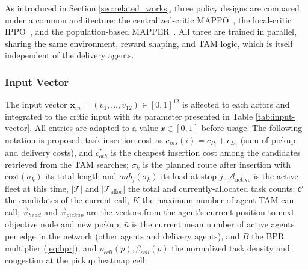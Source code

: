 \documentclass[sigconf]{acmart}
\begin{document}
As introduced in Section \ref{sec:related_works}, three policy designs are compared under a common architecture: the centralized-critic MAPPO~\cite{yu2022}, the local-critic IPPO~\cite{dewitt2020}, and the population-based MAPPER~\cite{liu2020}. All three are trained in parallel, sharing the same environment, reward shaping, and TAM logic, which is itself independent of the delivery agents.

\subsubsection{Input Vector}

The input vector $\mathbf{x}_{\mathit{in}} = (v_1, \dots, v_{12}) \in [0,1]^{12}$ is affected to each actors and integrated to the critic input with its parameter presented in Table \ref{tab:input-vector}. All entries are adapted to a value $\mathcal{x}\in[0,1]$ before usage. The following notation is proposed: task insertion cost as $c_{\mathit{ins}}(i) = c_{P_i} + c_{D_i}$ (sum of pickup and delivery costs), and $c^*_{\mathit{oth}}$ is the cheapest insertion cost among the candidates retrieved from the TAM searches; $\sigma_k$ is the planned route after insertion with $\mathrm{cost}(\sigma_k)$ its total length and $\mathit{onb}_j(\sigma_k)$ its load at stop $j$; $\mathcal{A}_{\mathrm{active}}$ is the active fleet at this time, $|\mathcal{T}|$ and $|\mathcal{T}_{\mathrm{alloc}}|$ the total and currently-allocated task counts; $\mathcal{C}$ the candidates of the current call, $K$ the maximum number of agent TAM can call; $\vec{v}_{\mathit{head}}$ and $\vec{v}_{\mathit{pickup}}$ are the vectors from the agent's current position to next objective node and new pickup; $\bar{n}$ is the current mean number of active agents per edge in the network (other agents and delivery agents), and $B$ the BPR multiplier (\ref{eq:bpr}); and $\rho_{\mathit{cell}}(p), \beta_{\mathit{cell}}(p)$ the normalized task density and congestion at the pickup heatmap cell.
\end{document}
